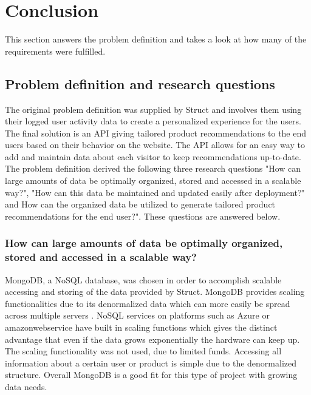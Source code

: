 
\chapter{Conclusion} %

\label{Conclusion} %


This section answers the problem definition and takes a look at how many of the requirements were fulfilled.

\section{Problem definition and research questions}

The original problem definition was supplied by \gls{Struct} and involves them using their logged user activity data to create a personalized experience for the users. The final solution is an \gls{API} giving tailored product recommendations to the end users based on their behavior on the website. The \gls{API} allows for an easy way to add and maintain data about each visitor to keep recommendations up-to-date. \\
The problem definition derived the following three research questions "How can large amounts of data be optimally organized, stored and accessed in a scalable way?",  "How can this data be maintained and updated easily after deployment?" and How can the organized data be utilized to generate tailored product recommendations for the end user?". These questions are answered below.

\subsection{How can large amounts of data be optimally organized, stored and accessed in a scalable way?}
\gls{MongoDB}, a \gls{NoSQL} database, was chosen in order to accomplish scalable accessing and storing of the data provided by \gls{Struct}. \Gls{MongoDB} provides scaling functionalities due to its denormalized data which can more easily be spread across multiple servers \cite{SQLvsNOSQL}. \Gls{NoSQL} services on platforms such as Azure or \gls{amazonwebservice} have built in scaling functions \cite{azureNoSQL} which gives the distinct advantage that even if the data grows exponentially the hardware can keep up. The scaling functionality was not used, due to limited funds. Accessing all information about a certain user or product is simple due to the denormalized structure. Overall \gls{MongoDB} is a good fit for this type of project with growing data needs.

